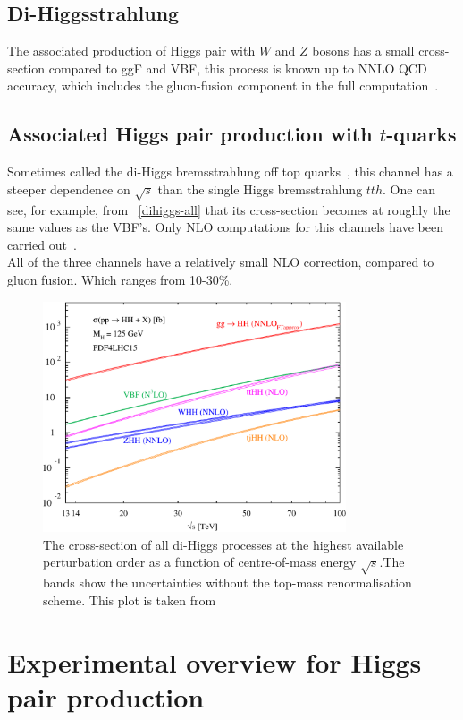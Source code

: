 \subsection{Di-Higgsstrahlung}
The associated production of Higgs pair with $W$ and $Z$ bosons has a small cross-section compared to ggF and VBF,  this process is known up to NNLO QCD accuracy, which includes the gluon-fusion component in the full computation~\cite{aglio:2012np,Li:2016nrr,Li:2017lbf}. 
\subsection{Associated Higgs pair production with $t$-quarks}
Sometimes called the di-Higgs bremsstrahlung off top quarks~\cite{DiMicco:2019ngk}, this channel has a steeper dependence on $\sqrt{s}$ than the single Higgs bremsstrahlung $t\bar t h$. One can see, for example, from ~\autoref{dihiggs-all} that its cross-section becomes at  roughly the same  values as the VBF's. Only NLO computations for this channels have been carried out~\cite{Frederix:2014hta}. \\ All of the three channels have a relatively small NLO correction, compared to gluon fusion. Which ranges from 10-30\%. 
\begin{figure}[!htpb]
	\centering
	\includegraphics[width = 0.8\textwidth]{./figures/cxn_HH}
	\caption{The cross-section of all di-Higgs processes at the highest available perturbation order as a function of centre-of-mass energy $\sqrt{s}$.The bands show the uncertainties without the top-mass renormalisation scheme. This plot is taken from~\cite{DiMicco:2019ngk}} 
	\label{dihiggs-all}
\end{figure}
%

\section{Experimental overview for Higgs pair production \label{exphh}  }


